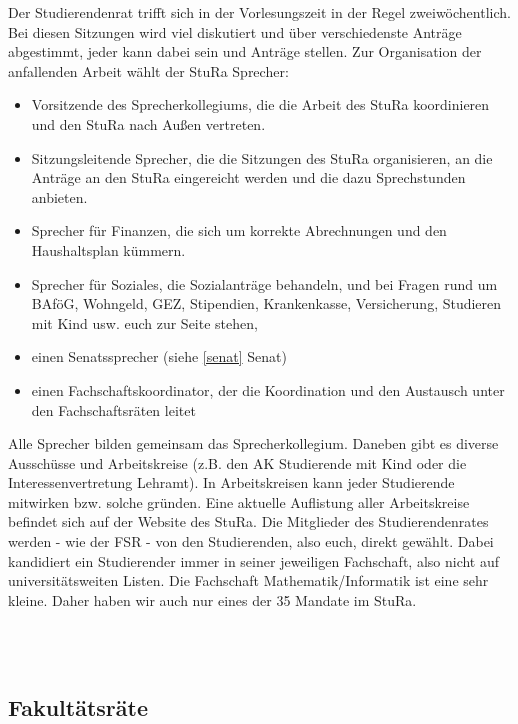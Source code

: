 Der Studierendenrat trifft sich in der Vorlesungszeit in der Regel zweiwöchentlich.
Bei diesen Sitzungen wird viel diskutiert und über verschiedenste Anträge abgestimmt, jeder kann dabei sein und Anträge stellen.
Zur Organisation der anfallenden Arbeit wählt der StuRa Sprecher:

\begin{itemize}
    \item Vorsitzende des Sprecherkollegiums, die die Arbeit des StuRa koordinieren und den StuRa nach Außen vertreten.
    \item Sitzungsleitende Sprecher, die die Sitzungen des StuRa organisieren, an die Anträge an den StuRa eingereicht werden und die dazu Sprechstunden anbieten.
    \item Sprecher für Finanzen, die sich um korrekte Abrechnungen und den Haushaltsplan kümmern.
    \item Sprecher für Soziales, die Sozialanträge behandeln, und bei Fragen rund um BAföG, Wohngeld, GEZ, Stipendien, Krankenkasse, Versicherung, Studieren mit Kind usw. euch zur Seite stehen,
    \item einen Senatssprecher (siehe \ref{senat} Senat)
    \item einen Fachschaftskoordinator, der die Koordination und den Austausch unter den Fachschaftsräten leitet
\end{itemize}

Alle Sprecher bilden gemeinsam das Sprecherkollegium.
Daneben gibt es diverse Ausschüsse und Arbeitskreise (z.B. den AK Studierende mit Kind oder die Interessenvertretung Lehramt).
In Arbeitskreisen kann jeder Studierende mitwirken bzw. solche gründen.
Eine aktuelle Auflistung aller Arbeitskreise befindet sich auf der Website des StuRa.
Die Mitglieder des Studierendenrates werden - wie der FSR - von den Studierenden, also euch, direkt gewählt.
Dabei kandidiert ein Studierender immer in seiner jeweiligen Fachschaft, also nicht auf universitätsweiten Listen.
Die Fachschaft Mathematik/Informatik ist eine sehr kleine.
Daher haben wir auch nur eines der 35 Mandate im StuRa.


\\
\\

\subsection{Fakultätsräte}

